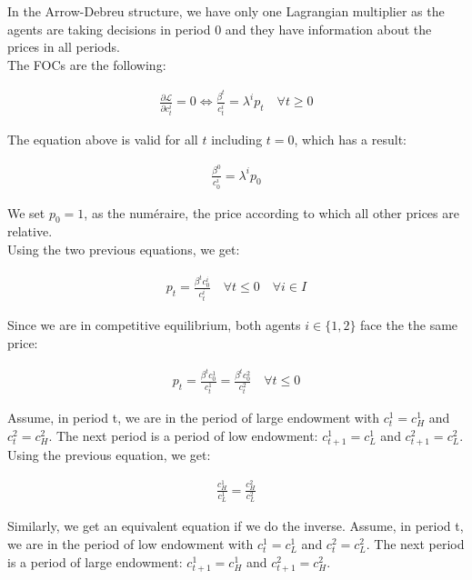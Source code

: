 \documentclass{article}
\begin{document}
In the Arrow-Debreu structure, we have only one Lagrangian multiplier as the agents are taking decisions in period 0 and they have information about the prices in all periods.\\

The FOCs are the following:

\begin{gather*}
    \frac{\partial\mathcal{L}}{\partial c_t^i}=0\Leftrightarrow \frac{\beta^t}{c_t^i}=\lambda^ip_t\quad\forall t\geq 0
\end{gather*}

The equation above is valid for all $t$ including $t=0$, which has a result:

\begin{gather*}
    \frac{\beta^0}{c_0^i}=\lambda^ip_0
\end{gather*}

We set $p_0=1$, as the numéraire, the price according to which all other prices are relative.\\

Using the two previous equations, we get:

\begin{gather*}
    p_t=\frac{\beta^tc_0^i}{c_t^i}\quad\forall t\leq0\quad\forall i\in I
\end{gather*}

Since we are in competitive equilibrium, both agents $i\in\{1,2\}$ face the the same price:

\begin{gather*}
    p_t =\frac{\beta^t c_0^1}{c_t^1}=\frac{\beta^t c_0^2}{c_t^2}\quad\forall t\leq0
\end{gather*}

Assume, in period t, we are in the period of large endowment with $c_t^1=c^1_H$ and $c_t^2=c^2_H$. The next period is a period of low endowment: $c_{t+1}^1=c^1_L$ and $c_{t+1}^2=c^2_L$.\\

Using the previous equation, we get:

\begin{gather*}
    \frac{c_H^1}{c_L^1}=\frac{c_H^2}{c_L^2}
\end{gather*}

Similarly, we get an equivalent equation if we do the inverse. Assume, in period t, we are in the period of low endowment with $c_t^1=c^1_L$ and $c_t^2=c^2_L$. The next period is a period of large endowment: $c_{t+1}^1=c^1_H$ and $c_{t+1}^2=c^2_H$.\\
\end{document}

